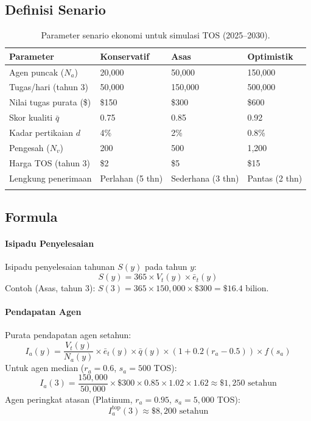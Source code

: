 \documentclass[11pt]{article}
\begin{document}
\subsection{Definisi Senario}
\begin{longtable}{@{}p{}p{}p{}p{}@{}}
\toprule
\textbf{Parameter} & \textbf{Konservatif} & \textbf{Asas} & \textbf{Optimistik} \\\midrule
Agen puncak ($N_a$) & 20,000 & 50,000 & 150,000 \\
Tugas/hari (tahun 3) & 50,000 & 150,000 & 500,000 \\
Nilai tugas purata (\$) & \$150 & \$300 & \$600 \\
Skor kualiti $\bar{q}$ & 0.75 & 0.85 & 0.92 \\
Kadar pertikaian $d$ & 4\% & 2\% & 0.8\% \\
Pengesah ($N_v$) & 200 & 500 & 1,200 \\
Harga TOS (tahun 3) & \$2 & \$5 & \$15 \\
Lengkung penerimaan & Perlahan (5 thn) & Sederhana (3 thn) & Pantas (2 thn) \\\bottomrule
\caption{Parameter senario ekonomi untuk simulasi TOS (2025--2030).}
\label{tab:econ-scenarios}
\end{longtable}

\subsection{Formula}
\paragraph{Isipadu Penyelesaian} Isipadu penyelesaian tahunan $S(y)$ pada tahun $y$:
\begin{equation}
S(y) = 365 \times V_t(y) \times \bar{e}_t(y)
\end{equation}
Contoh (Asas, tahun 3): $S(3) = 365 \times 150{,}000 \times \$300 = \$16.4$ bilion.

\paragraph{Pendapatan Agen} Purata pendapatan agen setahun:
\begin{equation}
I_a(y) = \frac{V_t(y)}{N_a(y)} \times \bar{e}_t(y) \times \bar{q}(y) \times (1 + 0.2(r_a - 0.5)) \times f(s_a)
\end{equation}
Untuk agen median ($r_a = 0.6$, $s_a = 500$ TOS):
\begin{equation}
I_a(3) = \frac{150{,}000}{50{,}000} \times \$300 \times 0.85 \times 1.02 \times 1.62 \approx \$1{,}250 \text{ setahun}
\end{equation}
Agen peringkat atasan (Platinum, $r_a = 0.95$, $s_a = 5{,}000$ TOS):
\begin{equation}
I_a^{\text{top}}(3) \approx \$8{,}200 \text{ setahun}
\end{equation}
\end{document}
